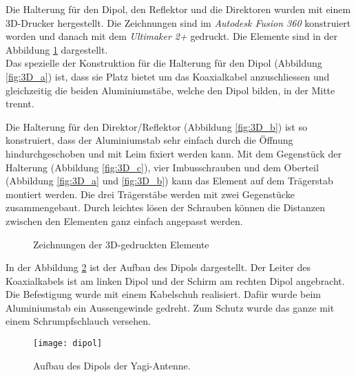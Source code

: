 Die Halterung für den Dipol, den Reflektor und die Direktoren wurden mit einem 3D-Drucker hergestellt. Die Zeichnungen sind im \textit{Autodesk Fusion 360} konstruiert worden und danach mit dem \textit{Ultimaker 2+} gedruckt. Die Elemente sind in der Abbildung \ref{fig:3D-Elemente} dargestellt.\\

Das spezielle der Konstruktion für die Halterung für den Dipol (Abbildung \ref{fig:3D_a}) ist, dass sie Platz bietet um das Koaxialkabel anzuschliessen und gleichzeitig die beiden Aluminiumstäbe, welche den Dipol bilden, in der Mitte trennt.

Die Halterung für den Direktor/Reflektor (Abbildung \ref{fig:3D_b}) ist so konstruiert, dass der Aluminiumstab sehr einfach durch die Öffnung hindurchgeschoben und mit Leim fixiert werden kann. 
Mit dem Gegenstück der Halterung (Abbildung \ref{fig:3D_c}), vier Imbusschrauben und dem Oberteil (Abbildung \ref{fig:3D_a} und \ref{fig:3D_b}) kann das Element auf dem Trägerstab montiert werden. Die drei Trägerstäbe werden mit zwei Gegenstücke zusammengebaut. Durch leichtes lösen der Schrauben können die Distanzen zwischen den Elementen ganz einfach angepasst werden.

\begin{figure}[H]
	\centering
	\qquad
	\qquad
	\caption{Zeichnungen der 3D-gedruckten Elemente }
	\label{fig:3D-Elemente}
\end{figure}

In der Abbildung \ref{fig:aufbau_dipol} ist der Aufbau des Dipols dargestellt. Der Leiter des Koaxialkabels ist am linken Dipol und der Schirm am rechten Dipol angebracht. Die Befestigung wurde mit einem Kabelschuh realisiert. Dafür wurde beim Aluminiumstab ein Aussengewinde gedreht. Zum Schutz wurde das ganze mit einem Schrumpfschlauch versehen.

\begin{figure}[H]
	\centering
	\texttt{[image: dipol]}
	\caption{Aufbau des Dipols der Yagi-Antenne.}\label{fig:aufbau_dipol}
\end{figure}
